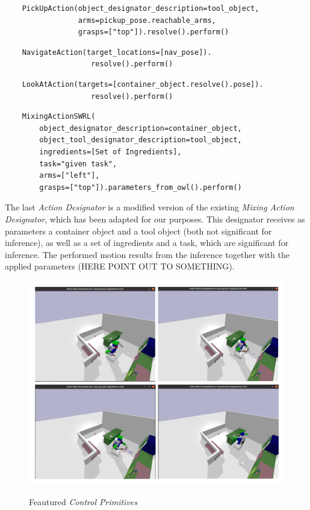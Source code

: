 \begin{lstlisting}
	PickUpAction(object_designator_description=tool_object,
                 arms=pickup_pose.reachable_arms,
                 grasps=["top"]).resolve().perform()
\end{lstlisting}

\begin{lstlisting}
	NavigateAction(target_locations=[nav_pose]).
					resolve().perform()
\end{lstlisting}

\begin{lstlisting}
	LookAtAction(targets=[container_object.resolve().pose]).
					resolve().perform()
\end{lstlisting}

\begin{lstlisting}
	MixingActionSWRL(
		object_designator_description=container_object,
        object_tool_designator_description=tool_object,
		ingredients=[Set of Ingredients],
        task="given task",
        arms=["left"],
        grasps=["top"]).parameters_from_owl().perform()
\end{lstlisting}

The last \textit{Action Designator} is a modified version of the existing \textit{Mixing Action Designator}, which has been adapted for our purposes. This designator receives as parameters a container object and a tool object (both not significant for inference), as well as a set of ingredients and a task, which are significant for inference. The performed motion results from the inference together with the applied parameters (HERE POINT OUT TO SOMETHING).

\begin{figure}[H]
    \includegraphics[scale=0.3]{Graphics/control_primitives.jpg}
    \label{fig:controlprimitives}
    \caption{Feautured \textit{Control Primitives}}
\end{figure}


